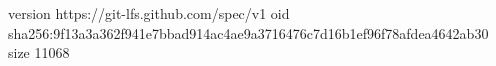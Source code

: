 version https://git-lfs.github.com/spec/v1
oid sha256:9f13a3a362f941e7bbad914ac4ae9a3716476c7d16b1ef96f78afdea4642ab30
size 11068
